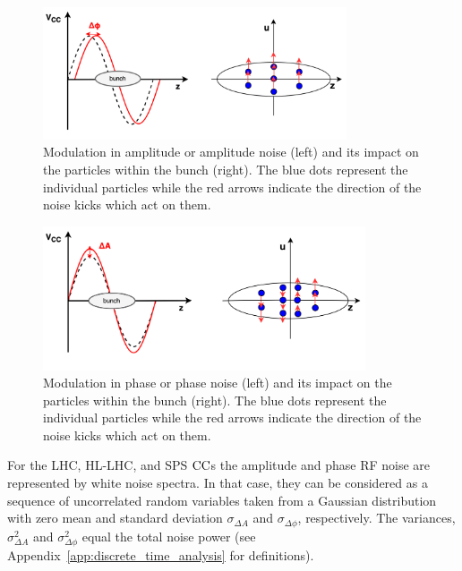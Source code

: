 \begin{figure}[!h] %
    \centering         
    \includegraphics[width=0.8\textwidth]{images/Ch3/amplitude_noiser_merged.png}
        \caption{Modulation in amplitude or amplitude noise (left) and its impact on the particles within the bunch (right). The blue dots represent the individual particles while the red arrows indicate the direction of the noise kicks which act on them.}
        \label{fig:amplitude_noise}
 \end{figure}

 \begin{figure}[!h] %
    \centering         
    \includegraphics[width=0.85\textwidth]{images/Ch3/phase_noise_merged.png}
        \caption{Modulation in phase or phase noise (left) and its impact on the particles within the bunch (right). The blue dots represent the individual particles while the red arrows indicate the direction of the noise kicks which act on them.}
        \label{fig:phase_noise}
 \end{figure}

For the LHC, HL-LHC, and SPS ${\mathrm{CC}}$s the amplitude and phase RF noise are represented by white noise spectra. In that case, they can be considered as a sequence of uncorrelated random variables taken from a Gaussian distribution with zero mean and standard deviation $\sigma_{\Delta A}$ and  $\sigma_{\Delta \phi}$, respectively. The variances,  $\sigma_{\Delta A}^2$ and  $\sigma_{\Delta \phi}^2$ equal the total noise power (see Appendix~\ref{app:discrete_time_analysis} for definitions). %

